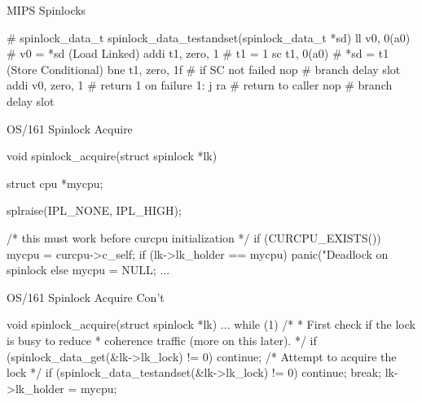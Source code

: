 \documentclass[11pt,aspectratio=169]{beamer}
\begin{document}
\begin{slide}{MIPS Spinlocks}
\vspace{-1em}
\begin{mipsasm}
# spinlock_data_t spinlock_data_testandset(spinlock_data_t *sd)
    ll      v0, 0(a0)           # v0 = *sd (Load Linked)
    addi    t1, zero, 1         # t1 = 1
    sc      t1, 0(a0)           # *sd = t1 (Store Conditional)
    bne     t1, zero, 1f        # if SC not failed
    nop                         # branch delay slot
    addi    v0, zero, 1         # return 1 on failure
1:  j       ra                  # return to caller
    nop                         # branch delay slot
\end{mipsasm}
\end{slide}

\begin{slide}{OS/161 Spinlock Acquire}
\begin{smallccode}
void spinlock_acquire(struct spinlock *lk)
{
  struct cpu *mycpu;
  
  splraise(IPL_NONE, IPL_HIGH);
  
  /* this must work before curcpu initialization */
  if (CURCPU_EXISTS()) {
    mycpu = curcpu->c_self;
    if (lk->lk_holder == mycpu) {
      panic("Deadlock on spinlock %
    }
  } else {
    mycpu = NULL;
  }
  ...
}
\end{smallccode}
\end{slide}

\begin{slide}{OS/161 Spinlock Acquire Con't}
\begin{smallccode}
void spinlock_acquire(struct spinlock *lk)
{
  ...
  while (1) {
    /*
     * First check if the lock is busy to reduce
     * coherence traffic (more on this later).
     */
    if (spinlock_data_get(&lk->lk_lock) != 0) {
      continue;
    }
    /* Attempt to acquire the lock */
    if (spinlock_data_testandset(&lk->lk_lock) != 0) {
      continue;
    }
    break;
  }
  lk->lk_holder = mycpu;
}
\end{smallccode}
\end{slide}
\end{document}
